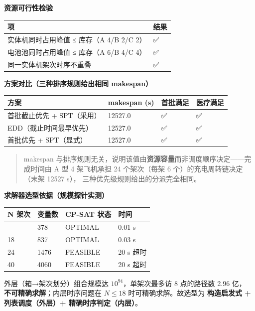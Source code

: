 \documentclass[
  10.5pt,
]{extarticle}
\newcounter{none} %
\begin{document}
\textbf{资源可行性检验}

{\def\LTcaptype{none} %
\begin{longtable}[]{@{}ll@{}}
\toprule\noalign{}
项 & 结果 \\
\midrule\noalign{}
\endhead
\bottomrule\noalign{}
\endlastfoot
实体机同时占用峰值 ≤ 库存（A 4/B 2/C 2） & ✅ \\
电池池同时占用峰值 ≤ 库存（A 6/B 4/C 4） & ✅ \\
同一实体机架次时序不重叠 & ✅ \\
\end{longtable}
}

\textbf{方案对比（三种排序规则给出相同 makespan）}

{\def\LTcaptype{none} %
\begin{longtable}[]{@{}llll@{}}
\toprule\noalign{}
方案 & makespan (s) & 首批满足 & 医疗满足 \\
\midrule\noalign{}
\endhead
\bottomrule\noalign{}
\endlastfoot
首批截止优先 + SPT（采用） & 12527.0 & ✅ & ✅ \\
EDD（截止时间最早优先） & 12527.0 & ✅ & ✅ \\
首批优先 + SPT（显式） & 12527.0 & ✅ & ✅ \\
\end{longtable}
}

\begin{quote}
makespan
与排序规则无关，说明该值由\textbf{资源容量}而非调度顺序决定------完成时间由
A 型 4 架飞机承担 24 个架次（每架 6 个）的充电周转链决定（末架 12527
s）， 三种优先级规则给出的分派完全相同。
\end{quote}

\textbf{求解器选型依据（规模探针实测）}

{\def\LTcaptype{none} %
\begin{longtable}[]{@{}llll@{}}
\toprule\noalign{}
N 架次 & 变量数 & CP-SAT 状态 & 时间 \\
\midrule\noalign{}
\endhead
\bottomrule\noalign{}
\endlastfoot
12 & 378 & OPTIMAL & 0.01 s \\
18 & 837 & OPTIMAL & 0.03 s \\
24 & 1476 & FEASIBLE & 20 s 超时 \\
40 & 4060 & FEASIBLE & 20 s 超时 \\
\end{longtable}
}

外层（箱→架次划分）组合规模达 \(10^{94}\)，单架次最多访 8 点的路径数
2.96 亿， \textbf{不可精确求解}；内层时序问题在 \(N\le18\)
时可精确求解。故选型为 \textbf{构造启发式 + 列表调度（外层）+
精确时序判定（内层）}。
\end{document}
